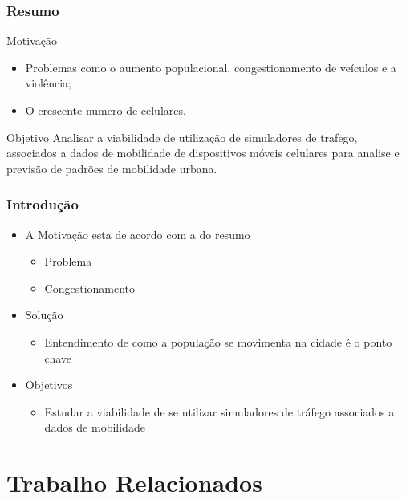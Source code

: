 \documentclass{beamer}
\begin{document}

\begin{frame}
	\frametitle{Resumo}
	\begin{block}{Motivação}
		\begin{itemize}
			\item Problemas como o aumento populacional, congestionamento de veículos e a violência;
			\item O crescente numero de celulares.
		\end{itemize}
	\end{block}

	\begin{block}{Objetivo}
		Analisar a viabilidade de utilização de simuladores de trafego, associados a dados de mobilidade de dispositivos móveis celulares para analise e previsão de padrões de mobilidade urbana.
	\end{block}
\end{frame}


\begin{frame}
	\frametitle{Introdução}
	\begin{itemize}
		\item A Motivação esta de acordo com a do resumo
		\begin{itemize}
			\item {Problema}
			\item Congestionamento
		\end{itemize}
		\item Solução
		\begin{itemize}
			\item Entendimento de como a população se movimenta na cidade é o ponto chave
		\end{itemize}
		\item Objetivos
		\begin{itemize}
			\item Estudar a viabilidade de se utilizar simuladores de tráfego associados a dados de mobilidade
		\end{itemize}
	\end{itemize}
\end{frame}


\section{Trabalho Relacionados} %
\end{document}
